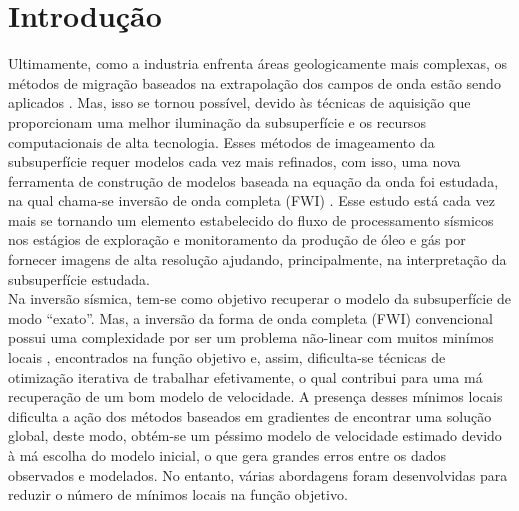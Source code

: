 \chapter{Introdução}


Ultimamente, como a industria enfrenta áreas geologicamente mais complexas, os métodos de migração baseados na extrapolação dos campos de onda estão sendo aplicados \citep{claerbout_1971, symes_2008}. Mas, isso se tornou possível, devido às técnicas de aquisição que proporcionam uma melhor iluminação da subsuperfície e os recursos computacionais de alta tecnologia. Esses métodos de imageamento da subsuperfície requer modelos cada vez mais refinados, com isso, uma nova ferramenta de construção de modelos baseada na equação da onda foi estudada, na qual chama-se inversão de onda completa (FWI) \citep{fichtner_2011, virieux_overview_2009, tarantola_2005, tarantola_linearized_1984}. Esse estudo está cada vez mais se tornando um elemento estabelecido do fluxo de processamento sísmicos nos estágios de exploração e monitoramento da produção de óleo e gás por fornecer imagens de alta resolução ajudando, principalmente, na interpretação da subsuperfície estudada. \\

Na inversão sísmica, tem-se como objetivo recuperar o modelo da subsuperfície de modo ``exato''. Mas, a inversão da forma de onda completa (FWI) convencional possui uma complexidade por ser um problema não-linear com muitos minímos locais \citep{bunks_1995}, encontrados na função objetivo e, assim, dificulta-se técnicas de otimização iterativa de trabalhar efetivamente, o qual contribui para uma má recuperação de um bom modelo de velocidade. A presença desses mínimos locais  dificulta a ação dos métodos baseados em gradientes de encontrar uma solução global, deste modo, obtém-se um péssimo modelo de velocidade estimado devido à  má escolha do modelo inicial, o que gera grandes erros entre os dados observados e modelados. No entanto, várias abordagens foram desenvolvidas para reduzir o número de mínimos locais na função objetivo.   \\
 
